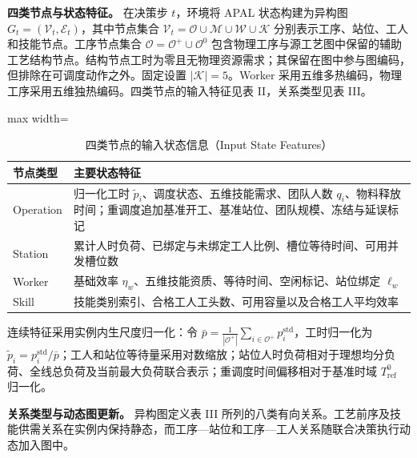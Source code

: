 \documentclass[journal,10pt]{IEEEtran}
\renewcommand{\arraystretch}{1.04}
\begin{document}
\textbf{四类节点与状态特征。} 在决策步 $t$，环境将 APAL 状态构建为异构图 $G_t=(\mathcal{V}_t,\mathcal{E}_t)$，其中节点集合 $\mathcal{V}_t=\mathcal{O}\cup\mathcal{M}\cup\mathcal{W}\cup\mathcal{K}$ 分别表示工序、站位、工人和技能节点。工序节点集合 $\mathcal{O}=\mathcal{O}^{+}\cup\mathcal{O}^{0}$ 包含物理工序与源工艺图中保留的辅助工艺结构节点。结构节点工时为零且无物理资源需求；其保留在图中参与图编码，但排除在可调度动作之外。固定设置 $|\mathcal{K}|=5$。Worker 采用五维多热编码，物理工序采用五维独热编码。四类节点的输入特征见表 II，关系类型见表 III。

\begin{table}[!t]
\centering
\caption{四类节点的输入状态信息（Input State Features）}
\label{tab:node_features}
\setlength{\tabcolsep}{3pt}
\renewcommand{\arraystretch}{1.0}
\begin{adjustbox}{max width=\columnwidth}
\begin{tabular}{@{}lp{6.8cm}@{}}
\toprule
\textbf{节点类型} & \textbf{主要状态特征} \\
\midrule
Operation & 归一化工时 $\widetilde p_i$、调度状态、五维技能需求、团队人数 $q_i$、物料释放时间；重调度追加基准开工、基准站位、团队规模、冻结与延误标记 \\
Station & 累计人时负荷、已绑定与未绑定工人比例、槽位等待时间、可用并发槽位数 \\
Worker & 基础效率 $\eta_w$、五维技能资质、等待时间、空闲标记、站位绑定 $\ell_w$ \\
Skill & 技能类别索引、合格工人工头数、可用容量以及合格工人平均效率 \\
\bottomrule
\end{tabular}
\end{adjustbox}
\vspace{2pt}
\par{}\par
\end{table}

连续特征采用实例内生尺度归一化：令 $\bar p = \frac{1}{|\mathcal{O}^{+}|}\sum_{i\in\mathcal{O}^{+}}p_i^{\mathrm{std}}$，工时归一化为 $\widetilde p_i = p_i^{\mathrm{std}}/\bar p$；工人和站位等待量采用对数缩放；站位人时负荷相对于理想均分负荷、全线总负荷及当前最大负荷联合表示；重调度时间偏移相对于基准时域 $T_{\mathrm{ref}}^0$ 归一化。

\textbf{关系类型与动态图更新。} 异构图定义表 III 所列的八类有向关系。工艺前序及技能供需关系在实例内保持静态，而工序---站位和工序---工人关系随联合决策执行动态加入图中。
\end{document}
